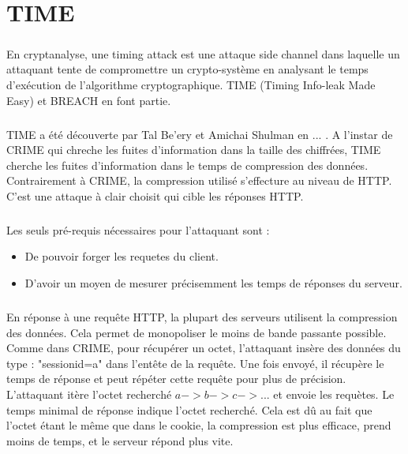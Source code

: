 \chapter{TIME}

\paragraph{}
En cryptanalyse, une timing attack est une attaque side channel dans laquelle un attaquant tente de compromettre un crypto-système en analysant le temps d'exécution de l'algorithme cryptographique. TIME (Timing Info-leak Made Easy) et BREACH en font partie.

\paragraph{}
TIME a été découverte par Tal Be'ery et Amichai Shulman en ... . A l'instar de CRIME qui chreche les fuites d'information dans la taille des chiffrées, TIME cherche les fuites d'information dans le temps de compression des données. Contrairement à CRIME, la compression utilisé s'effecture au niveau de HTTP.
C'est une attaque à clair choisit qui cible les réponses HTTP.

\paragraph{}
Les seuls pré-requis nécessaires pour l'attaquant sont :
\begin{itemize}
  \item De pouvoir forger les requetes du client.
  \item D'avoir un moyen de mesurer précisemment les temps de réponses du serveur.
\end{itemize}

\paragraph{}
En réponse à une requête HTTP, la plupart des serveurs utilisent la compression des données. Cela permet de monopoliser le moins de bande passante possible.
Comme dans CRIME, pour récupérer un octet, l'attaquant insère des données du type : "sessionid=a" dans l'entête de la requête. Une fois envoyé, il récupère le temps de réponse et peut répéter cette requête pour plus de précision. 
L'attaquant itère l'octet recherché \(a -> b -> c -> ...\) et envoie les requètes. Le temps minimal de réponse indique l'octet recherché. Cela est dû au fait que l'octet étant le même que dans le cookie, la compression est plus efficace, prend moins de temps, et le serveur répond plus vite.
